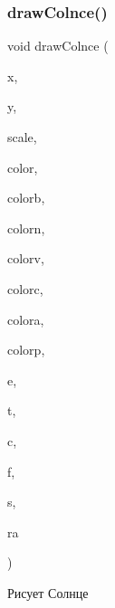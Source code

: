 \subsubsection{\texorpdfstring{draw\+Colnce()}{drawColnce()}}
{\footnotesize\ttfamily void draw\+Colnce (\begin{DoxyParamCaption}\item[{int}]{x,  }\item[{int}]{y,  }\item[{double}]{scale,  }\item[{C\+O\+L\+O\+R\+R\+EF}]{color,  }\item[{C\+O\+L\+O\+R\+R\+EF}]{colorb,  }\item[{C\+O\+L\+O\+R\+R\+EF}]{colorn,  }\item[{C\+O\+L\+O\+R\+R\+EF}]{colorv,  }\item[{C\+O\+L\+O\+R\+R\+EF}]{colorc,  }\item[{C\+O\+L\+O\+R\+R\+EF}]{colora,  }\item[{C\+O\+L\+O\+R\+R\+EF}]{colorp,  }\item[{double}]{e,  }\item[{double}]{t,  }\item[{int}]{c,  }\item[{double}]{f,  }\item[{int}]{s,  }\item[{int}]{ra }\end{DoxyParamCaption})}



Рисует Солнце 


